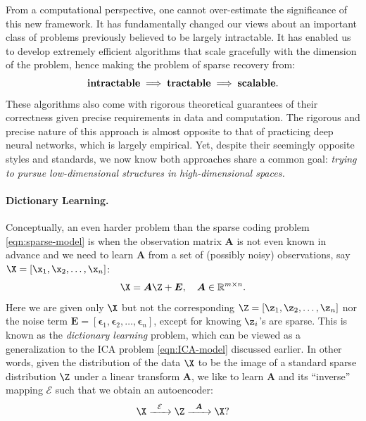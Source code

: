 \documentclass[../../book-main.tex]{subfiles}
\begin{document}
From a computational perspective, one cannot over-estimate the significance of this new framework. It has fundamentally changed our views about an important class of problems previously believed to be largely intractable. It has enabled us to develop extremely efficient algorithms that scale gracefully with the dimension of the problem, hence making the problem of sparse recovery from:
\begin{equation}
    \mbox{\textbf{intractable}} \;
   \Longrightarrow \; \mbox{\textbf{tractable}} \; \Longrightarrow \; 
   \mbox{\textbf{scalable}}.
\end{equation}
These algorithms also come with rigorous theoretical guarantees of their correctness given precise requirements in data and computation. The rigorous and precise nature of this approach is almost opposite to that of practicing deep neural networks, which is largely empirical. Yet, despite their seemingly opposite styles and standards, we now know both approaches share a common goal: {\em trying to pursue low-dimensional structures in high-dimensional spaces.}

\paragraph{Dictionary Learning.}
Conceptually, an even harder problem than the sparse coding problem \eqref{eqn:sparse-model} is when the observation matrix $\boldsymbol{A}$ is not even known in advance and we need to learn $\boldsymbol{A}$ from a set of (possibly noisy) observations, say $\X = [\x_1, \x_2, \ldots, \x_n]$:
\begin{equation}
    \X = \boldsymbol{A} \Z + \boldsymbol{E}, \quad \boldsymbol{A} \in \mathbb{R}^{m\times n}.
    \label{eqn:dictionary-learning}
\end{equation}
Here we are given only $\X$ but not the corresponding $\Z = [\z_1, \z_2, \ldots, \z_n]$ nor the noise term $\boldsymbol{E}= [\boldsymbol{\epsilon}_1, \boldsymbol{\epsilon}_2, \ldots, \boldsymbol{\epsilon}_n]$, except for knowing $\z_i$'s are sparse. This is known as the {\em dictionary learning} problem, which can be viewed as a generalization to the ICA problem \eqref{eqn:ICA-model} discussed earlier. In other words, given the distribution of the data $\X$ to be the image of a standard sparse distribution $\Z$ under a linear transform $\boldsymbol{A}$, we like to learn $\boldsymbol{A}$ and its ``inverse'' mapping $\mathcal{E}$ such that we obtain an autoencoder:
\begin{equation}
    \X   \xrightarrow{\hspace{2mm} \mathcal{E} \hspace{2mm}}  \Z \xrightarrow{\hspace{2mm} \boldsymbol{A} \hspace{2mm}} \X?
       \label{eqn:decoding-DL}
\end{equation}
\end{document}
